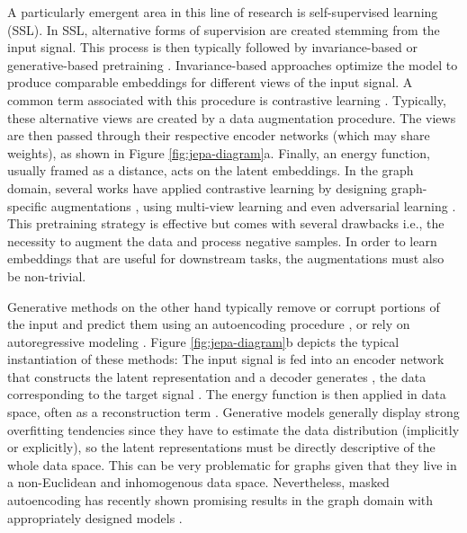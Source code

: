 \documentclass{article} \usepackage{iclr2024_conference,times}
\begin{document}
A particularly emergent area in this line of research is self-supervised learning (SSL). In SSL, alternative forms of supervision are created stemming from the input signal. This process is then typically followed by invariance-based or generative-based pretraining \citep{liu2023sslsurvey,assran2023self}. Invariance-based approaches optimize the model to produce comparable embeddings for different views of the input signal. A common term associated with this procedure is contrastive learning \citep{tian2020makes}. Typically, these alternative views are created by a data augmentation procedure. The views are then passed through their respective encoder networks (which may share weights), as shown in Figure \ref{fig:jepa-diagram}a. Finally, an energy function, usually framed as a distance, acts on the latent embeddings. In the graph domain, several works have applied contrastive learning by designing graph-specific augmentations \citep{you2020graph}, using multi-view learning \citep{hassani2020contrastive} and even adversarial learning \citep{suresh2021adversarial}. This pretraining strategy is effective but comes with several drawbacks i.e., the necessity to augment the data and process negative samples. In order to learn embeddings that are useful for downstream tasks, the augmentations must also be non-trivial.

Generative methods on the other hand typically remove or corrupt portions of the input and predict them using an autoencoding procedure \citep{vincent2010stacked,he2022masked}, or rely on autoregressive modeling \citep{brown2020language,hu2020gpt}. Figure \ref{fig:jepa-diagram}b depicts the typical instantiation of these methods: The input signal  is fed into an encoder network that constructs the latent representation and a decoder generates , the data corresponding to the target signal . The energy function is then applied in data space, often as a reconstruction term \citep{bengio2013representation}. Generative models generally display strong overfitting tendencies since they have to estimate the data distribution (implicitly or explicitly), so the latent representations must be directly descriptive of the whole data space. This can be very problematic for graphs given that they live in a non-Euclidean and inhomogenous data space. Nevertheless, masked autoencoding has recently shown promising results in the graph domain with appropriately designed models \citep{hou2022graphmae,tan2023s2gae}. 
\end{document}
